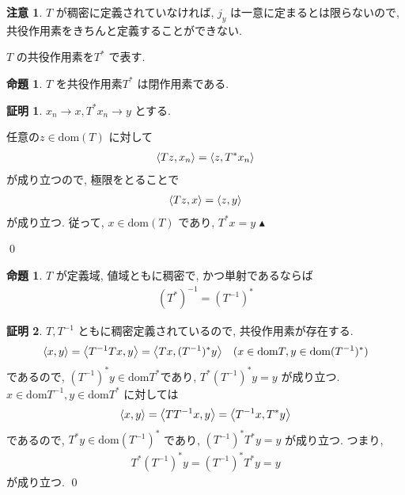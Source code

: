 \documentclass[10pt, fleqn, label-section=none]{bxjsarticle}
\theoremstyle{definition}
\newtheorem{prop}[dfn]{命題}
\newtheorem*{pf*}{証明}
\newtheorem{remark}[dfn]{注意}
\newcommand{\tbra}[1]{\mleft\langle#1\mright\rangle}
\renewcommand{\;}{\, ; \,}
\newenvironment{claim}[1]{\par\noindent\underline{claim:}\space#1}{}
\newenvironment{claimproof}[1]{\par\noindent{($\because$)}\space#1}{\hfill $\blacktriangle $}
\begin{document}
\begin{remark}
$T$ が稠密に定義されていなければ, $j_y$ は一意に定まるとは限らないので, 共役作用素をきちんと定義することができない. 
\end{remark}



$T$ の共役作用素を$T^*$ で表す. 





\begin{prop}
$T$ を共役作用素$T^*$ は閉作用素である. 
\end{prop}
\begin{pf*}
$x_n \rightarrow x, T^* x_n \rightarrow y$ とする. 
\begin{claimproof}
任意の$z \in \textrm{dom}(T) $ に対して
\begin{align*} \tbra{Tz, x_n} = \tbra{z, T^* x_n} \end{align*}
が成り立つので, 極限をとることで
\begin{align*} \tbra{Tz, x} = \tbra{z, y} \end{align*}
が成り立つ. 従って, $x \in \textrm{dom}(T)$ であり, $T^* x = y$
\end{claimproof}

\qed
\end{pf*}


\begin{prop}
$T$ が定義域, 値域ともに稠密で, かつ単射であるならば
\begin{align*} (T^*)^{-1} = (T^{-1})^* \end{align*}
\end{prop}
\begin{pf*}$T, T^{-1}$ ともに稠密定義されているので, 共役作用素が存在する. 
\begin{align*} \tbra{x,y} = \tbra{T^{-1} T x, y} = \tbra{Tx, (T^{-1})^* y} \quad (x \in \textrm{dom}T, y \in \textrm{dom}(T^{-1})^*) \end{align*}
であるので, $(T^{-1})^* y \in \textrm{dom}T^*$であり, $T^* (T^{-1})^* y = y$ が成り立つ. $x \in \textrm{dom} T^{-1}, y \in \textrm{dom} T^*$ に対しては
\begin{align*} \tbra{x, y} = \tbra{TT^{-1} x, y} = \tbra{T^{-1}x, T^* y} \end{align*}
であるので, $T^* y \in \textrm{dom} (T^{-1})^*$ であり, $(T^{-1})^* T^* y = y$ が成り立つ. 
つまり, 
\begin{align*}T^* (T^{-1})^* y =  (T^{-1})^* T^* y  = y \end{align*}
が成り立つ. 
\qed
\end{pf*}
\end{document}
